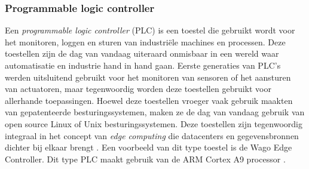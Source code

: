 \subsubsection{Programmable logic controller}
Een \textit{programmable logic controller} (PLC) is een toestel die gebruikt wordt voor het monitoren, loggen en sturen van industriële machines en processen. Deze toestellen zijn de dag van vandaag uiteraard onmisbaar in een wereld waar automatisatie en industrie hand in hand gaan. Eerste generaties van PLC’s werden uitsluitend gebruikt voor het monitoren van sensoren of het aansturen van actuatoren, maar tegenwoordig worden deze toestellen gebruikt voor allerhande toepassingen. Hoewel deze toestellen vroeger vaak gebruik maakten van gepatenteerde besturingssystemen, maken ze de dag van vandaag gebruik van open source Linux of Unix besturingssystemen. Deze toestellen zijn tegenwoordig integraal in het concept van \textit{edge computing} die datacenters en gegevensbronnen dichter bij elkaar brengt \autocite{DeCraeke2022}. Een voorbeeld van dit type toestel is de Wago Edge Controller. Dit type PLC maakt gebruik van de ARM Cortex A9 processor \autocite{Wago2022}.
